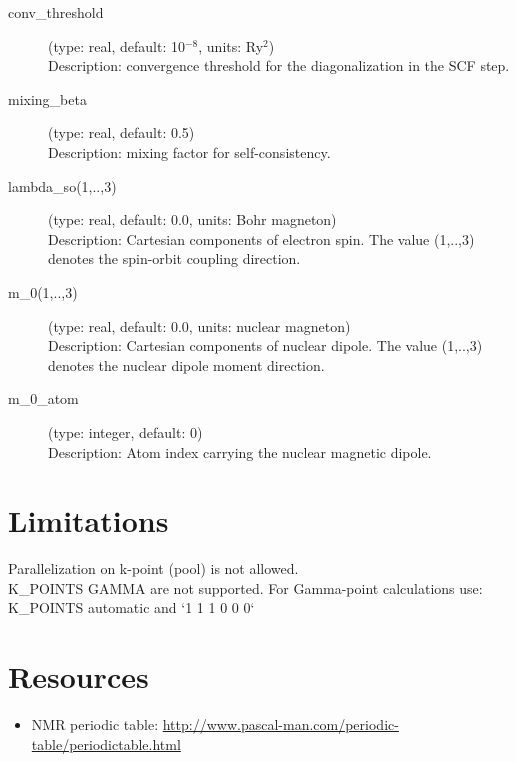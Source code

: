\documentclass[a4paper,11pt,twoside]{article}
\begin{document}
\begin{description}
\item[conv\_threshold] (type: real, default: 10$^{-8}$, units: Ry$^2$)\\
Description: convergence threshold for the diagonalization in the SCF step.

\item[mixing\_beta] (type: real, default: 0.5)\\
Description: mixing factor for self-consistency.

\item[lambda\_so(1,..,3)] (type: real, default: 0.0, units: Bohr magneton)\\
Description: Cartesian components of electron spin. The value (1,..,3) denotes the spin-orbit coupling direction.

\item[m\_0(1,..,3)] (type: real, default: 0.0, units: nuclear magneton)\\
Description: Cartesian components of nuclear dipole. The value (1,..,3) denotes the nuclear dipole moment direction.

\item[m\_0\_atom] (type: integer, default: 0)\\
Description: Atom index carrying the nuclear magnetic dipole.


\end{description}


\section{Limitations}
Parallelization on k-point (pool) is not allowed.\\
K\_POINTS GAMMA are not supported. For Gamma-point calculations use: K\_POINTS automatic and `1 1 1 0 0 0`


\section{Resources}
\begin{itemize}

\item NMR periodic table: \url{http://www.pascal-man.com/periodic-table/periodictable.html}

\end{itemize}


\begin{thebibliography}{99}
\bibitem{}
  

\end{thebibliography}

\end{document}

